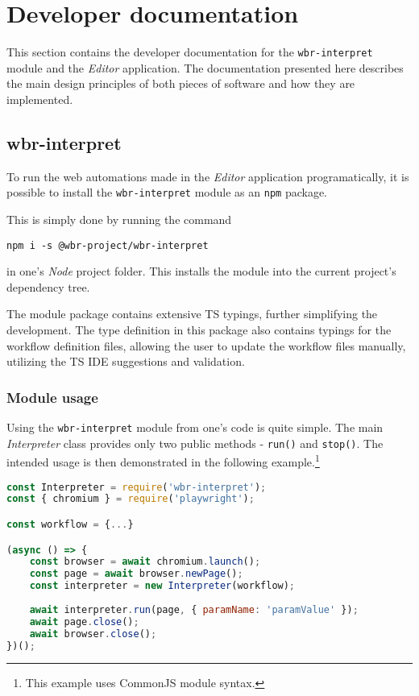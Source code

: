 \clearpage
\section{Developer documentation} \label{devDocs}

This section contains the developer documentation for the \texttt{wbr-interpret} module and the \textit{Editor} application.
The documentation presented here describes the main design principles of both pieces of software and how they are implemented.

\subsection{wbr-interpret}

To run the web automations made in the \textit{Editor} application programatically, 
it is possible to install the \texttt{wbr-interpret} module as an \texttt{npm} package.

This is simply done by running the command
\begin{center}
\verb|npm i -s @wbr-project/wbr-interpret|
\end{center}
in one's \textit{Node} project folder. 
This installs the module into the current project's dependency tree.

The module package contains extensive \acs{TS} typings, further simplifying the development.
The type definition in this package also contains typings for the workflow definition files, allowing the user to update the workflow files manually, 
utilizing the \acl{TS} \acs{IDE} suggestions and validation.

\subsubsection{Module usage}

Using the \texttt{wbr-interpret} module from one's code is quite simple.
The main \textit{Interpreter} class provides only two public methods - \texttt{run()} and \texttt{stop()}.
The intended usage is then demonstrated in the following example.\footnote{This example uses CommonJS module syntax.}

\begin{lstlisting}[language=javascript]
const Interpreter = require('wbr-interpret');
const { chromium } = require('playwright');

const workflow = {...}

(async () => {
    const browser = await chromium.launch();
    const page = await browser.newPage();
    const interpreter = new Interpreter(workflow);
    
    await interpreter.run(page, { paramName: 'paramValue' });
    await page.close();
    await browser.close();
})();
\end{lstlisting}


